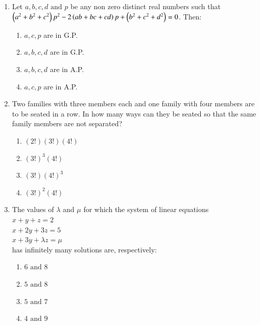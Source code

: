 \documentclass[journal]{IEEEtran}
\theoremstyle{remark}
\begin{document}
\begin{enumerate}
\item  Let $a, b, c, d \text{ and } p$ be any non zero distinct real numbers such that $\left(a^2+b^2+c^2\right)p^2-2\left(ab+bc+cd\right)p +\left(b^2 +c^2+d^2\right) = 0$. Then:\hfill{}
\begin{multicols}{2}
\begin{enumerate}
\item $a, c, p$ are in G.P.
\item $a, b, c, d$ are in G.P.
\item $ a, b, c, d$ are in A.P.
\item $a, c, p$ are in A.P.
\end{enumerate}
\end{multicols}

\item  Two families with three members each and one family with four members are to be seated in a row. In how many ways can they be seated so that the same family members are not separated?\hfill{}
\begin{multicols}{4}
\begin{enumerate}
\item $(2!) (3!) (4!)$
\item $(3!)^3 (4!)$
\item $ (3!)(4!)^3$
\item $(3!)^2 (4!)$
\end{enumerate}
\end{multicols}

\item  The values of $\lambda$ and $\mu$ for which the system of linear equations\\
$x+y+z = 2$\\
$x+2y+3z = 5$\\
$x+3y+\lambda z = \mu$\\
has infinitely many solutions are, respectively:\hfill{}
\begin{multicols}{4}
\begin{enumerate}
\item $6 \text{ and } 8$
\item $5 \text{ and } 8$
\item $5 \text{ and } 7$
\item $4 \text{ and } 9$
\end{enumerate}
\end{multicols}


\end{enumerate}
\end{document}
